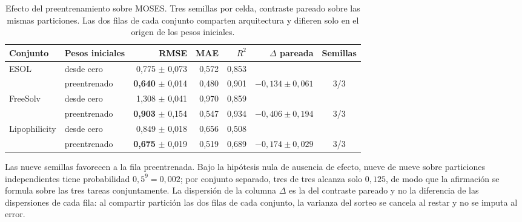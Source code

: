\begin{table}[htbp]
  \centering
  \caption{Efecto del preentrenamiento sobre MOSES. Tres semillas por celda,
           contraste pareado sobre las mismas particiones. Las dos filas de
           cada conjunto comparten arquitectura y difieren solo en el origen
           de los pesos iniciales.}
  \label{tab:b1-preentrenamiento}
  \small
  \begin{tabular}{@{}llrrrrc@{}}
    \toprule
    Conjunto & Pesos iniciales & RMSE & MAE & $R^2$ & $\Delta$ pareada & Semillas \\
    \midrule
    \multirow{2}{*}{ESOL}
      & desde cero    & 0,775 $\pm$ 0,073 & 0,572 & 0,853 &                    &     \\
      & preentrenado  & \textbf{0,640} $\pm$ 0,014 & 0,480 & 0,901 & $-0{,}134 \pm 0{,}061$ & 3/3 \\
    \midrule
    \multirow{2}{*}{FreeSolv}
      & desde cero    & 1,308 $\pm$ 0,041 & 0,970 & 0,859 &                    &     \\
      & preentrenado  & \textbf{0,903} $\pm$ 0,154 & 0,547 & 0,934 & $-0{,}406 \pm 0{,}194$ & 3/3 \\
    \midrule
    \multirow{2}{*}{Lipophilicity}
      & desde cero    & 0,849 $\pm$ 0,018 & 0,656 & 0,508 &                    &     \\
      & preentrenado  & \textbf{0,675} $\pm$ 0,019 & 0,519 & 0,689 & $-0{,}174 \pm 0{,}029$ & 3/3 \\
    \bottomrule
  \end{tabular}

  \vspace{0.5em}
  \begin{minipage}{0.92\textwidth}
    \footnotesize
    Las nueve semillas favorecen a la fila preentrenada. Bajo la hipótesis nula de
    ausencia de efecto, nueve de nueve sobre particiones independientes tiene
    probabilidad $0{,}5^9 = 0{,}002$; por conjunto separado, tres de tres alcanza solo
    $0{,}125$, de modo que la afirmación se formula sobre las tres tareas conjuntamente.
    La dispersión de la columna $\Delta$ es la del contraste pareado y no la diferencia
    de las dispersiones de cada fila: al compartir partición las dos filas de cada
    conjunto, la varianza del sorteo se cancela al restar y no se imputa al error.
  \end{minipage}
\end{table}
